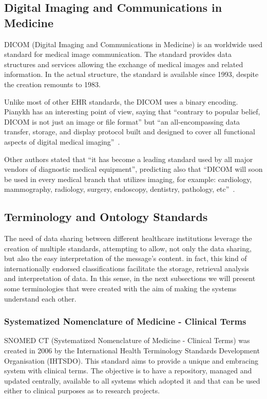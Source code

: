 \subsection{Digital Imaging and Communications in Medicine} \label{sec:dicom}

DICOM (Digital Imaging and Communications in Medicine) is an worldwide used standard for medical image communication. The standard provides data structures and services allowing the exchange of medical images and related information. In the actual structure, the standard is available since 1993, despite the creation remounts to 1983.

Unlike most of other EHR standards, the DICOM uses a binary encoding. Pianykh has an interesting point of view, saying that ``contrary to popular belief, DICOM is not just an image or file format'' but ``an all-encompassing data transfer, storage, and display protocol built and designed to cover all functional aspects of digital medical imaging''~\citep{Pianykh2008}.

Other authors stated that ``it has become a leading standard used by all major vendors of diagnostic medical equipment'', predicting also that ``DICOM will soon be used in every medical branch that utilizes imaging, for example: cardiology, mammography, radiology, surgery, endoscopy, dentistry, pathology, etc''~\citep{Mustra2008}.


\subsection{Terminology and Ontology Standards}

The need of data sharing between different healthcare institutions leverage the creation of multiple standards, attempting to allow, not only the data sharing, but also the easy interpretation of the message's content. in fact, this kind of internationally endorsed classifications facilitate the storage, retrieval analysis and interpretation of data. In this sense, in the next subsections we will present some terminologies that were created with the aim of making the systems understand each other.

\subsubsection{Systematized Nomenclature of Medicine - Clinical Terms} \label{sec:snomed}

SNOMED CT (Systematized Nomenclature of Medicine - Clinical Terms) was created in 2006 by the International Health Terminology Standards Development Organisation (IHTSDO). This standard aims to provide a unique and embracing system with clinical terms. The objective is to have a repository, managed and updated centrally, available to all systems which adopted it and that can be used either to clinical purposes as to research projects.~\citep{ACSS/MS2009a}

